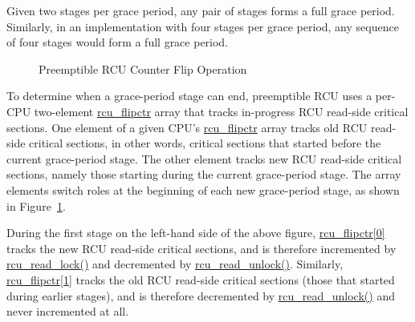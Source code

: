 Given two stages per grace period, any pair of
stages forms a full grace period.
Similarly, in an implementation with four stages per grace period,
any sequence of four stages would form a full grace period.

\begin{figure}[htb]
\begin{center}
\end{center}
\caption{Preemptible RCU Counter Flip Operation}
\label{app:rcuimpl:Preemptible RCU Counter Flip Operation}
\end{figure}

To determine when a grace-period stage can end,
preemptible RCU uses a per-CPU two-element \url{rcu_flipctr} array
that tracks in-progress RCU read-side critical sections.
One element of a given CPU's \url{rcu_flipctr} array tracks
old RCU read-side critical sections, in other words, critical sections
that started before the current grace-period stage.
The other element tracks new RCU read-side critical
sections, namely those starting during the current grace-period stage.
The array elements switch roles at the beginning of each new grace-period
stage, as shown in
Figure~\ref{app:rcuimpl:Preemptible RCU Counter Flip Operation}.

During the first stage on the left-hand side of the above figure,
\url{rcu_flipctr[0]} tracks the new
RCU read-side critical sections, and is therefore incremented by
\url{rcu_read_lock()} and decremented by \url{rcu_read_unlock()}.
Similarly, \url{rcu_flipctr[1]} tracks the old RCU read-side
critical sections (those that started during earlier stages), and
is therefore decremented by \url{rcu_read_unlock()} and never
incremented at all.

